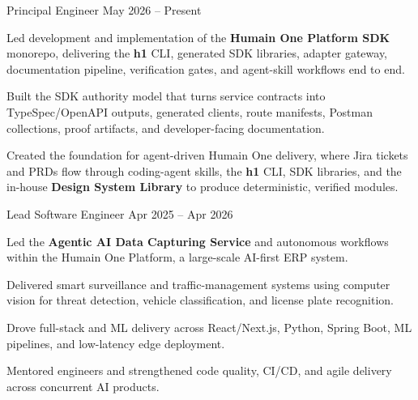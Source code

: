 
\begin{cventries}

  \cventry
    {Principal Engineer}
    {}
    {May 2026 -- Present}
    {
      \begin{cvitems}
        \item {Led development and implementation of the \textbf{Humain One Platform SDK} monorepo, delivering the \textbf{h1} CLI, generated SDK libraries, adapter gateway, documentation pipeline, verification gates, and agent-skill workflows end to end.}
        \item {Built the SDK authority model that turns service contracts into TypeSpec/OpenAPI outputs, generated clients, route manifests, Postman collections, proof artifacts, and developer-facing documentation.}
        \item {Created the foundation for agent-driven Humain One delivery, where Jira tickets and PRDs flow through coding-agent skills, the \textbf{h1} CLI, SDK libraries, and the in-house \textbf{Design System Library} to produce deterministic, verified modules.}
      \end{cvitems}
    }

  \cventry
    {Lead Software Engineer}
    {}
    {Apr 2025 -- Apr 2026}
    {
      \begin{cvitems}
        \item {Led the \textbf{Agentic AI Data Capturing Service} and autonomous workflows within the Humain One Platform, a large-scale AI-first ERP system.}
        \item {Delivered smart surveillance and traffic-management systems using computer vision for threat detection, vehicle classification, and license plate recognition.}
        \item {Drove full-stack and ML delivery across React/Next.js, Python, Spring Boot, ML pipelines, and low-latency edge deployment.}
        \item {Mentored engineers and strengthened code quality, CI/CD, and agile delivery across concurrent AI products.}
      \end{cvitems}
    }


\end{cventries}
